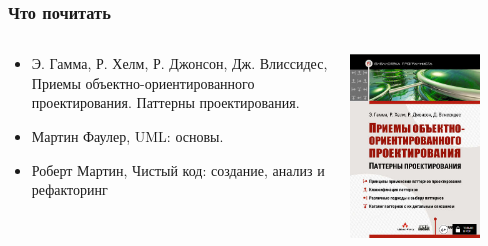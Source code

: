 \documentclass{../../slides-style}
\begin{document}
    \begin{frame}
        \frametitle{Что почитать}
        \begin{columns}
            \begin{column}{0.6\textwidth}
                \begin{itemize}
                    \item Э. Гамма, Р. Хелм, Р. Джонсон, Дж. Влиссидес, Приемы объектно-ориентированного проектирования. Паттерны проектирования.
                    \item Мартин Фаулер, UML: основы.
                    \item Роберт Мартин, Чистый код: создание, анализ и рефакторинг
                \end{itemize}
            \end{column}
            \begin{column}{0.4\textwidth}
                \begin{center}
                    \includegraphics[width=0.8\textwidth]{patternBookCover.png}
                \end{center}
            \end{column}
        \end{columns}
    \end{frame}
\end{document}
